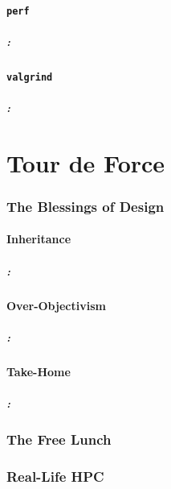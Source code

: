 \documentclass[9pt,xcolor=table]{beamer}
\begin{document}
\subsection{\texttt{perf}}
\begin{frame}
\frametitle{\insertsectionhead{}: \insertsubsectionhead{}}
\end{frame}

\subsection{\texttt{valgrind}}
\begin{frame}
\frametitle{\insertsectionhead{}: \insertsubsectionhead{}}
\end{frame}


\part{Tour de Force}
\section{The Blessings of Design}
\subsection{Inheritance}
\begin{frame}
\frametitle{\insertsectionhead{}: \insertsubsectionhead{}}
\end{frame}

\subsection{Over-Objectivism}
\begin{frame}
\frametitle{\insertsectionhead{}: \insertsubsectionhead{}}
\end{frame}

\subsection{Take-Home}
\begin{frame}
\frametitle{\insertsectionhead{}: \insertsubsectionhead{}}
\end{frame}

\section{The Free Lunch}
\section{Real-Life HPC}
\end{document}
